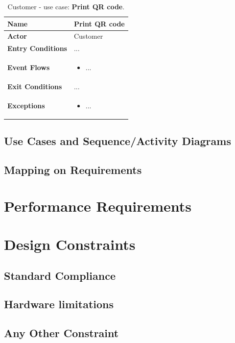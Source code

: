 \begin{table}[h!]
\centering
\begin{tabular}{| m{} | m{} |} 
	\hline
	\textbf{Name} & Print QR code \\ 
	\hline
	\textbf{Actor} & Customer \\ 
	\hline
	\textbf{Entry Conditions} & ... \\ 
	\hline
	\textbf{Event Flows} &
	\begin{itemize}
	\item ...
	\end{itemize} \\ 
	\hline
	\textbf{Exit Conditions} & ... \\ 
	\hline
	\textbf{Exceptions} &
	\begin{itemize}
	\item ...
	\end{itemize} \\ 
	\hline
\end{tabular}
\caption{Customer - use case: \textbf{Print QR code}.}
\label{tableLogIn}
\end{table}


\subsection{Use Cases and Sequence/Activity Diagrams}
\subsection{Mapping on Requirements}

\section{Performance Requirements}

\section{Design Constraints}

\subsection{Standard Compliance}
\subsection{Hardware limitations}
\subsection{Any Other Constraint}

